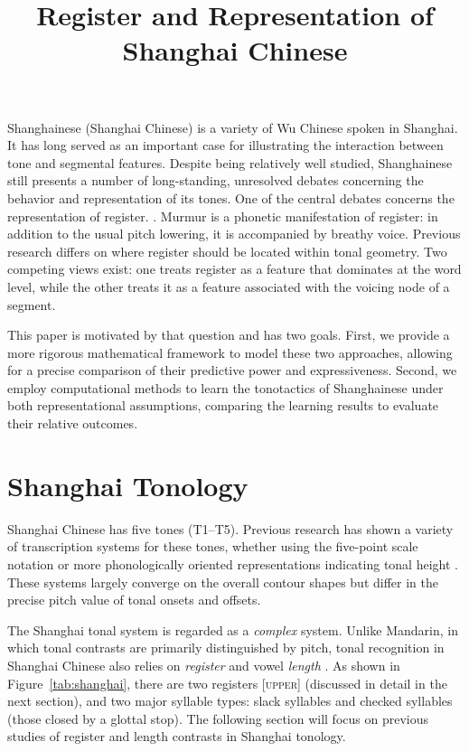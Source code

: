 \documentclass[11pt]{article}
\title{Register and Representation of Shanghai Chinese}
\begin{document}
\maketitle

Shanghainese (Shanghai Chinese) is a variety of Wu Chinese spoken in Shanghai. 
It has long served as an important case for illustrating the interaction 
between tone and segmental features. Despite being relatively well studied, 
Shanghainese still presents a number of long-standing, unresolved debates 
concerning the behavior and representation of its tones. One of the central 
debates concerns the representation of register. 
\citet{yip1980}. Murmur is a phonetic manifestation of register: in addition to 
the usual pitch lowering, it is accompanied by breathy voice. Previous research 
differs on where register should be located within tonal geometry. Two 
competing views exist: one treats register as a feature that dominates at the 
word level, while the other treats it as a feature associated with the voicing 
node of a segment.

This paper is motivated by that question and has two goals. First, we provide a 
more rigorous mathematical framework to model these two approaches, allowing 
for a precise comparison of their predictive power and expressiveness. 
Second, we employ computational methods to learn the tonotactics of 
Shanghainese under both representational assumptions, comparing the learning 
results to evaluate their relative outcomes.


\section{Shanghai Tonology}

Shanghai Chinese has five tones (T1–T5). Previous research has shown a variety 
of transcription systems for these tones, whether using the five-point scale 
notation \citep{chao1930system} or more phonologically oriented representations 
indicating tonal height \citep{yip1980}. These systems largely converge on the 
overall contour shapes but differ in the precise pitch value of tonal onsets 
and offsets. 



The Shanghai tonal system is regarded as a \textit{complex} system. Unlike 
Mandarin, in which tonal contrasts are primarily distinguished by pitch, tonal 
recognition in Shanghai Chinese also relies on \textit{register }and vowel 
\textit{length} \citep{zhu+2015tone}. As shown in Figure~\ref{tab:shanghai}, 
there are two registers \textsc{[upper]} (discussed in detail in the next 
section), and two major syllable types: slack syllables and checked syllables 
(those closed by a glottal stop). The following section will focus on previous 
studies of register and length contrasts in Shanghai tonology.
\end{document}
